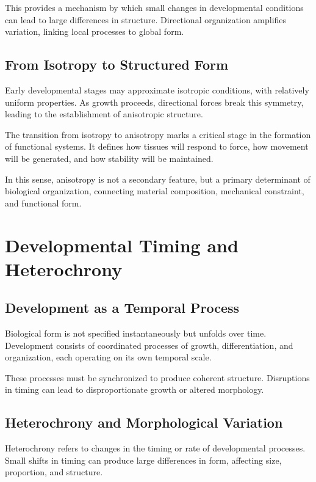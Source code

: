 \documentclass[11pt,oneside]{book}
\begin{document}
This provides a mechanism by which small changes in developmental conditions can lead to large differences in structure. Directional organization amplifies variation, linking local processes to global form.

\section{From Isotropy to Structured Form}

Early developmental stages may approximate isotropic conditions, with relatively uniform properties. As growth proceeds, directional forces break this symmetry, leading to the establishment of anisotropic structure.

The transition from isotropy to anisotropy marks a critical stage in the formation of functional systems. It defines how tissues will respond to force, how movement will be generated, and how stability will be maintained.

In this sense, anisotropy is not a secondary feature, but a primary determinant of biological organization, connecting material composition, mechanical constraint, and functional form.

\chapter{Developmental Timing and Heterochrony}

\section{Development as a Temporal Process}

Biological form is not specified instantaneously but unfolds over time. Development consists of coordinated processes of growth, differentiation, and organization, each operating on its own temporal scale.

These processes must be synchronized to produce coherent structure. Disruptions in timing can lead to disproportionate growth or altered morphology.

\section{Heterochrony and Morphological Variation}

Heterochrony refers to changes in the timing or rate of developmental processes. Small shifts in timing can produce large differences in form, affecting size, proportion, and structure.
\end{document}

